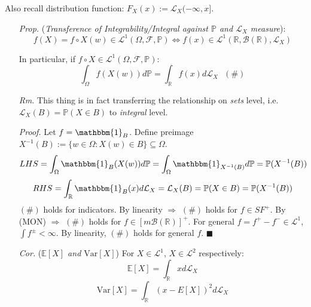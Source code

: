 \documentclass[a4paper,12pt,twoside]{book}
\begin{document}
Also recall distribution function: $F_X(x):=\mathcal{L}_X(-\infty,x]$.

\begin{itemize}
	\item[\textit{Prop.}] (\textit{Transference of Integrability/Integral against $\mathbb{P}$ and $\mathcal{L}_X$ measure}): 
	$$f(X)=f\circ X(w)\in \mathcal{L}^1 (\Omega, \mathcal{F}, \mathbb{P}) \iff f(x) \in \mathcal{L}^1(\mathbb{R}, \mathscr{B}(\mathbb{R}), \mathcal{L}_X)$$

	In particular, if $f\circ X\in \mathcal{L}^1 (\Omega, \mathcal{F}, \mathbb{P})$:
	\begin{equation}
		\int_{\Omega}f(X(w))d \mathbb{P}=\int_{\mathbb{R}}f(x) d\mathcal{L}_X~~~(\#)
	\end{equation}


	\item[\textit{Rm.}] This thing is in fact transferring the relationship on \textit{sets} level, i.e. $\mathcal{L}_X(B)=\mathbb{P}(X\in B)$ to \textit{integral} level.

	
	\item[\textit{Proof.}] Let $f=\mathbbm{1}_{B}$. Define preimage $X^{-1}(B):=\{w\in \Omega: X(w)\in B\} \subseteq \Omega$.
	\begin{equation}
		LHS=\int_{\Omega}\mathbbm{1}_{B}(X(w))d \mathbb{P}=\int_{\Omega}\mathbbm{1}_{X^{-1}(B)}d \mathbb{P}=\mathbb{P}(X^{-1}(B))
	\end{equation}
	\begin{equation}
		RHS=\int_{\mathbb{R}}\mathbbm{1}_{B}(x) d\mathcal{L}_X=\mathcal{L}_X(B)=\mathbb{P}(X\in B)=\mathbb{P}(X^{-1}(B))
	\end{equation}
	$(\#)$ holds for indicators. \newline
	By linearity $\Rightarrow$ $(\#)$ holds for $f\in SF^+$. \newline
	By (MON) $\Rightarrow$ $(\#)$ holds for $f\in [m \mathscr{B}(\mathbb{R})]^+$. \newline
	For general $f=f^+-f^-\in \mathcal{L}^1$, $\int f^{\pm}< \infty$. By linearity, $(\#)$ holds for general $f$. $\blacksquare$

	\item[\textit{Cor.}] (\textit{$\mathbb{E}\left[X\right]$ and $\mathrm{Var}\left[X\right]$}) For $X\in \mathcal{L}^1$, $X\in \mathcal{L}^2$ respectively: 
	\begin{equation}
		\mathbb{E}\left[X\right]=\int_{\mathbb{R}} x d\mathcal{L}_X
	\end{equation}
	\begin{equation}
		\mathrm{Var}\left[X\right]=\int_{\mathbb{R}} (x-E[X])^2 d\mathcal{L}_X
	\end{equation}


\end{itemize}
\end{document}
